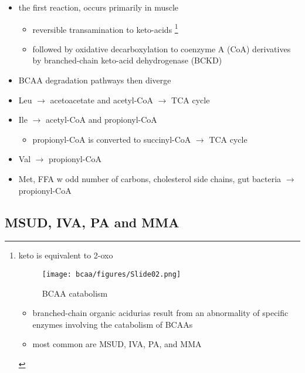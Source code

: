 \documentclass{scrartcl}
\begin{document}
\begin{itemize}
\item the first reaction, occurs primarily in muscle
\begin{itemize}
\item reversible transamination to keto-acids \footnote{keto is equivalent to 2-oxo

\begin{figure}[htbp]
\centering
\texttt{[image: bcaa/figures/Slide02.png]}
\caption{\label{fig:orgff6149a}BCAA catabolism}
\end{figure}

\begin{itemize}
\item branched-chain organic acidurias result from an abnormality of
specific enzymes involving the catabolism of BCAAs
\item most common are MSUD, IVA, PA, and MMA
\end{itemize}}
\item followed by oxidative decarboxylation to coenzyme A (CoA)
derivatives by branched-chain keto-acid dehydrogenase
(BCKD)
\end{itemize}
\item BCAA degradation pathways then diverge
\item Leu \(\to\) acetoacetate and acetyl-CoA \(\to\) TCA cycle
\item Ile \(\to\) acetyl-CoA and propionyl-CoA
\begin{itemize}
\item propionyl-CoA is converted to succinyl-CoA \(\to\) TCA cycle
\end{itemize}
\item Val \(\to\) propionyl-CoA
\item Met, FFA w odd number of carbons, cholesterol side chains, gut
bacteria \(\to\) propionyl-CoA
\end{itemize}

\subsection{MSUD, IVA, PA and MMA}
\label{sec:org2d1eadd}
\end{document}
